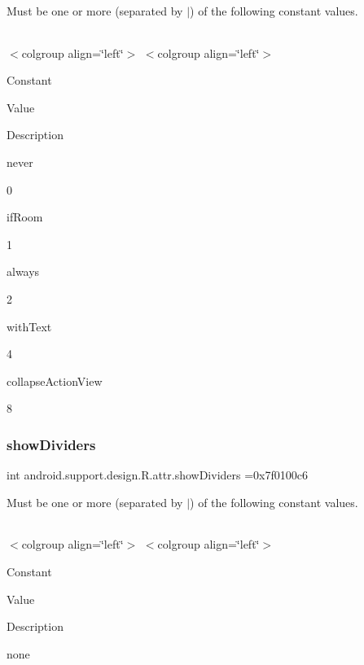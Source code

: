 Must be one or more (separated by \textquotesingle{}$\vert$\textquotesingle{}) of the following constant values.

\tabulinesep=1mm
\begin{longtabu} spread 0pt [c]{*{0}{|X[-1]}|}
\hline
\end{longtabu}
$<$colgroup align=\char`\"{}left\char`\"{}$>$ $<$colgroup align=\char`\"{}left\char`\"{}$>$ 

Constant

Value

Description 

{\ttfamily never}

0

{\ttfamily if\+Room}

1

{\ttfamily always}

2

{\ttfamily with\+Text}

4

{\ttfamily collapse\+Action\+View}

8\mbox{\label{classandroid_1_1support_1_1design_1_1R_1_1attr_a1f12216785c0071388c469052f16e508}} 
\subsubsection{\texorpdfstring{show\+Dividers}{showDividers}}
{\footnotesize\ttfamily int android.\+support.\+design.\+R.\+attr.\+show\+Dividers =0x7f0100c6\hspace{0.3cm}{\ttfamily [static]}}

Must be one or more (separated by \textquotesingle{}$\vert$\textquotesingle{}) of the following constant values.

\tabulinesep=1mm
\begin{longtabu} spread 0pt [c]{*{0}{|X[-1]}|}
\hline
\end{longtabu}
$<$colgroup align=\char`\"{}left\char`\"{}$>$ $<$colgroup align=\char`\"{}left\char`\"{}$>$ 

Constant

Value

Description 

{\ttfamily none}

